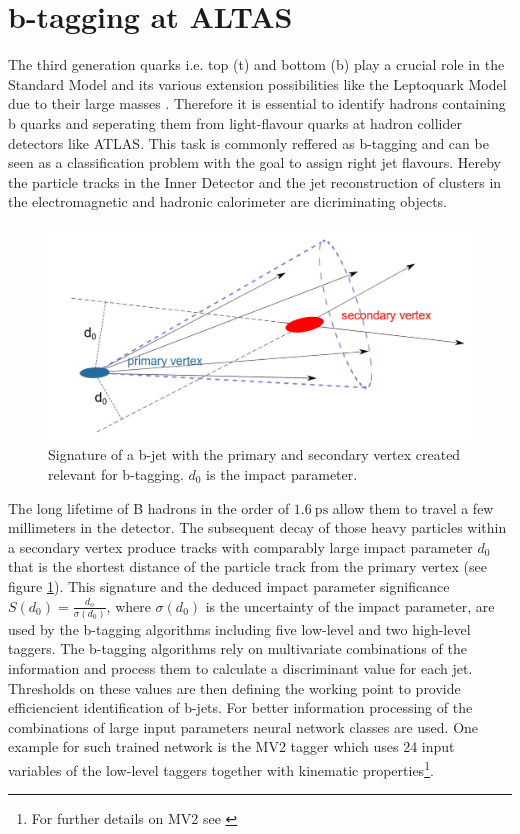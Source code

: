\section{b-tagging at ALTAS}\label{btagging}
The third generation quarks i.e. top (t) and bottom (b) play a crucial role in the Standard Model and its various extension possibilities like the Leptoquark Model due to their large masses \cite{Hansson}. Therefore it is essential to identify hadrons containing b quarks and seperating them from light-flavour quarks at hadron collider detectors like ATLAS. This task is commonly reffered as b-tagging and can be seen as a classification problem with the goal to assign right jet flavours. Hereby the particle tracks in the Inner Detector and the jet reconstruction of clusters in the electromagnetic and hadronic calorimeter are dicriminating objects. \cite{Paganini}\par
%
\begin{figure}[htbp]                                 
 \begin{center}                                       
  \includegraphics[width=0.55\linewidth]{figures/btagged.pdf} 
   \caption[Tracks in a b-jet.]{Signature of a b-jet with the primary and secondary vertex created relevant for b-tagging. $d_0$ is the impact parameter. \cite{Hansson}}
  \label{btagged}                                    
 \end{center}
\end{figure}
%
The long lifetime of B hadrons in the order of $\SI{1.6}{\pico\second}$ allow them to travel a few millimeters in the detector. The subsequent decay of those heavy particles within a secondary vertex produce tracks with comparably large impact parameter $d_0$ that is the shortest distance of the particle track from the primary vertex (see figure \ref{btagged}). This signature and the deduced impact parameter significance $S(d_0)=\frac{d_o}{\sigma(d_0)}$, where $\sigma(d_0)$ is the uncertainty of the impact parameter, are used by the b-tagging algorithms including five low-level and two high-level taggers. \cite{Hansson} The b-tagging algorithms rely on multivariate combinations of the information and process them to calculate a discriminant value for each jet. Thresholds on these values are then defining the working point to provide efficiencient identification of b-jets. For better information processing of the combinations of large input parameters neural network classes are used. \cite{Luca} One example for such trained network is the MV2 tagger which uses 24 input variables of the low-level taggers together with kinematic properties\footnote{For further details on MV2 see \cite{MV2}}. \cite{Paganini}
